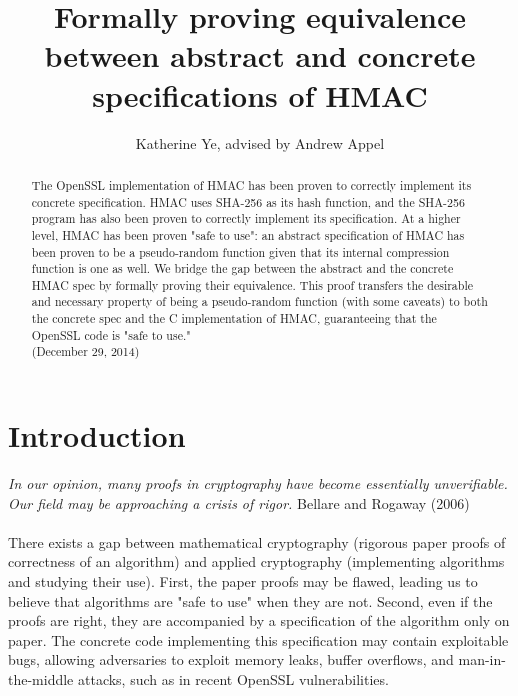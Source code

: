 \documentclass[twocolumn,showpacs,%
  nofootinbib,aps,superscriptaddress,%
  eqsecnum,prd,notitlepage,showkeys,10pt]{revtex4-1}
\begin{document}
\title{Formally proving equivalence between abstract and concrete specifications of HMAC}
\author{Katherine Ye, advised by Andrew Appel}

\begin{abstract}
The OpenSSL implementation of HMAC has been proven to correctly implement its concrete specification. HMAC uses SHA-256 as its hash function, and the SHA-256 program has also been proven to correctly implement its specification. At a higher level, HMAC has been proven "safe to use": an abstract specification of HMAC has been proven to be a pseudo-random function given that its internal compression function is one as well. We bridge the gap between the abstract and the concrete HMAC spec by formally proving their equivalence. This proof transfers the desirable and necessary property of being a pseudo-random function (with some caveats) to both the concrete spec and the C implementation of HMAC, guaranteeing that the OpenSSL code is "safe to use."
\\
\indent
(December 29, 2014)

\end{abstract}

\maketitle


\section{Introduction}


{\it In our opinion, many proofs in cryptography have become essentially unverifiable. Our field may be approaching a crisis of rigor.}  
Bellare and Rogaway (2006) \\
\\
There exists a gap between mathematical cryptography (rigorous paper proofs of correctness of an algorithm) and applied cryptography (implementing algorithms and studying their use). First, the paper proofs may be flawed, leading us to believe that algorithms are "safe to use" when they are not. Second, even if the proofs are right, they are accompanied by a specification of the algorithm only on paper. The concrete code implementing this specification may contain exploitable bugs, allowing adversaries to exploit memory leaks, buffer overflows, and man-in-the-middle attacks, such as in recent OpenSSL vulnerabilities.
\end{document}
